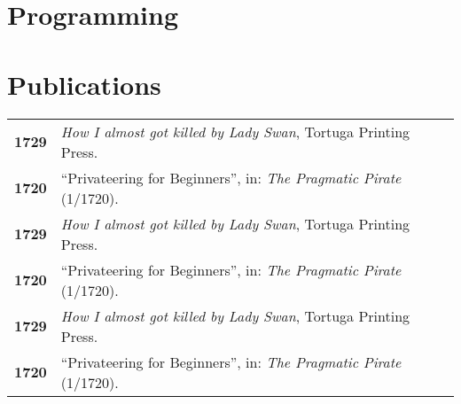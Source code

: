 \documentclass{modernsimplecv}
\newlength{\rightcolwidth}
\begin{document}
\begin{paracol}{2}
\begin{minipage}[t]{\rightcolwidth}
\end{minipage}

\vspace{2em}


\lipsum[10]



\bigskip

\section{Programming} 
{\small
\lipsum[20]

}
\bigskip

\begin{skillsection}{\rightcolwidth}
\end{skillsection}


\bigskip



\vspace{4em}


\begin{minipage}[t]{\rightcolwidth}
\section*{Publications}
\begin{tabular}{>{\footnotesize\bfseries}r >{\footnotesize}p{}}
    1729 & \emph{How I almost got killed by Lady Swan}, Tortuga Printing Press. \\
    1720 & ``Privateering for Beginners'', in: \emph{The Pragmatic Pirate} (1/1720).\\
    1729 & \emph{How I almost got killed by Lady Swan}, Tortuga Printing Press. \\
    1720 & ``Privateering for Beginners'', in: \emph{The Pragmatic Pirate} (1/1720).\\
    1729 & \emph{How I almost got killed by Lady Swan}, Tortuga Printing Press. \\
    1720 & ``Privateering for Beginners'', in: \emph{The Pragmatic Pirate} (1/1720).
\end{tabular}
\bigskip


\end{minipage}
\end{paracol}
\end{document}
